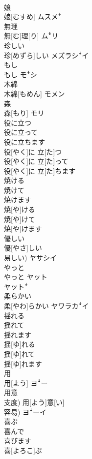 \documentclass[8pt]{extreport}
\begin{document}
\begin{CJK}{UTF8}{min}
\\	娘	
\\	娘[むすめ]	ムスメꜜ
\\	無理	
\\	無[む]理[り]	ムꜜリ
\\	珍しい	
\\	珍[めずら]しい	メズラシꜜイ
\\	もし	
\\	もし	モꜜシ
\\	木綿	
\\	木綿[もめん]	モメン
\\	森	
\\	森[もり]	モリ
\\	役に立つ 
\\	役に立って 
\\	役に立ちます	
\\	役[やく]に 立[た]つ 
\\	役[やく]に 立[た]って 
\\	役[やく]に 立[た]ちます	
\\	焼ける 
\\	焼けて 
\\	焼けます	
\\	焼[や]ける 
\\	焼[や]けて 
\\	焼[や]けます	
\\	優しい	
\\	優[やさ]しい 
\\	易しい)	ヤサシイ
\\	やっと	
\\	やっと	ヤット 
\\	ヤットꜜ
\\	柔らかい	
\\	柔[やわ]らかい	ヤワラカꜜイ
\\	揺れる 
\\	揺れて 
\\	揺れます	
\\	揺[ゆ]れる 
\\	揺[ゆ]れて 
\\	揺[ゆ]れます	
\\	用	
\\	用[よう]	ヨꜜー
\\	用意	
\\	支度)	用[よう]意[い] 
\\	容易)	ヨꜜーイ
\\	喜ぶ 
\\	喜んで 
\\	喜びます	
\\	喜[よろこ]ぶ 

\end{CJK}
\end{document}
